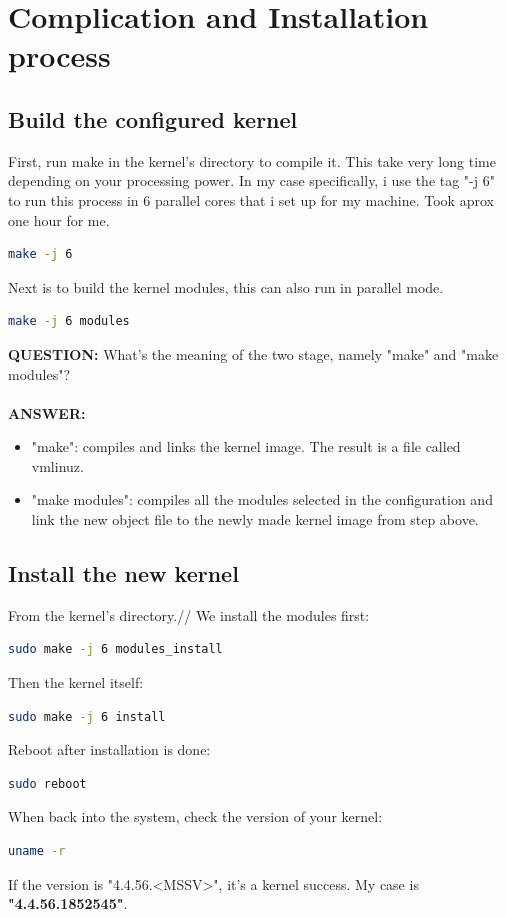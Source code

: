 \documentclass[a4paper]{article}
\begin{document}
\section{Complication and Installation process}
\subsection{Build the configured kernel}
First, run make in the kernel's directory to compile it. This take very long time depending on your processing power. In my case specifically, i use the tag "-j 6" to run this process in 6 parallel cores that i set up for my machine. Took aprox one hour for me.
\begin{lstlisting}[language=bash]
make -j 6
\end{lstlisting}
Next is to build the kernel modules, this can also run in parallel mode.
\begin{lstlisting}[language=bash]
make -j 6 modules
\end{lstlisting}
\textbf{QUESTION:} What's the meaning of the two stage, namely "make" and "make modules"?\\\\
\textbf{ANSWER:}
\begin{itemize}
\item "make": compiles and links the kernel image. The result is a file called vmlinuz.
\item "make modules": compiles all the modules selected in the configuration and link the new object file to the newly made kernel image from step above.
\end{itemize}
\subsection{Install the new kernel}
From the kernel's directory.//
We install the modules first:
\begin{lstlisting}[language=bash]
sudo make -j 6 modules_install
\end{lstlisting}
Then the kernel itself:
\begin{lstlisting}[language=bash]
sudo make -j 6 install
\end{lstlisting}
Reboot after installation is done:
\begin{lstlisting}[language=bash]
sudo reboot
\end{lstlisting}
When back into the system, check the version of your kernel:
\begin{lstlisting}[language=bash]
uname -r
\end{lstlisting}
If the version is "4.4.56.<MSSV>", it's a kernel success. My case is \textbf{"4.4.56.1852545"}.
\end{document}

